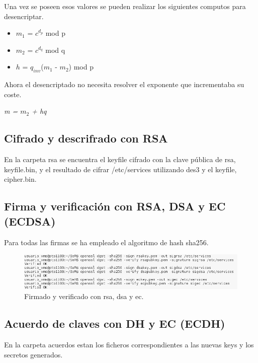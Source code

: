 \documentclass[11pt]{article}
\begin{document}
      \par
      Una vez se poseen esos valores se pueden realizar los siguientes computos para desencriptar.
      \begin{itemize}
        \item $m_1$ = $c^{d_p}$ mod p
        \item $m_2$ = $c^{d_q}$ mod q
        \item $h$ = $q_{inv}$($m_1$ - $m_2$) mod p
      \end{itemize}

      \par
      Ahora el desencriptado no necesita resolver el exponente que incrementaba su coste.
      \begin{center}
        \Large
        \textit{m = $m_2$ + hq}
      \end{center}

    \subsection{Cifrado y descrifrado con RSA}
      \par
      En la carpeta rsa se encuentra el keyfile cifrado con la clave pública de rsa, keyfile.bin,
      y el resultado de cifrar /etc/services utilizando des3 y el keyfile, cipher.bin.

    \subsection{Firma y verificación con RSA, DSA y EC (ECDSA)}
      \par
      Para todas las firmas se ha empleado el algoritmo de hash sha256.

      \FloatBarrier
      \begin{figure}[H]
        \centering
        \includegraphics[width = \textwidth]{signs}
        \caption{Firmado y verificado con rsa, dsa y ec.}
      \end{figure}

    \subsection{Acuerdo de claves con DH y EC (ECDH)} \label{ecdh}
      \par
      En la carpeta acuerdos estan los ficheros correspondientes a las nuevas keys y los secretos
      generados.
\end{document}

